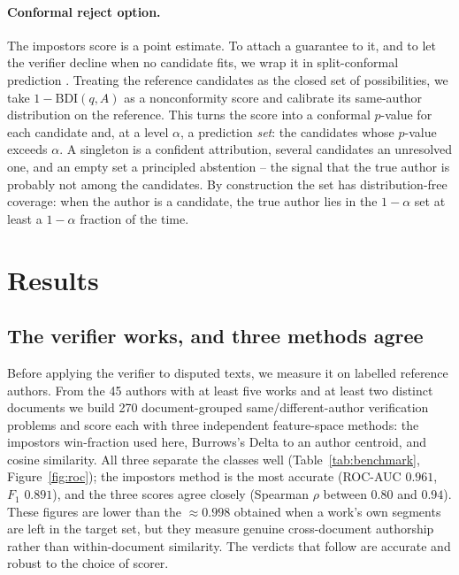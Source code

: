 \documentclass{anthology-ch}
\begin{document}
\paragraph{Conformal reject option.} The impostors score is a point estimate. To attach a guarantee to it, and to let the verifier decline when no candidate fits, we wrap it in split-conformal prediction \cite{vovk2005,angelopoulos2023}. Treating the reference candidates as the closed set of possibilities, we take $1-\mathrm{BDI}(q,A)$ as a nonconformity score and calibrate its same-author distribution on the reference. This turns the score into a conformal $p$-value for each candidate and, at a level $\alpha$, a prediction \emph{set}: the candidates whose $p$-value exceeds $\alpha$. A singleton is a confident attribution, several candidates an unresolved one, and an empty set a principled abstention -- the signal that the true author is probably not among the candidates. By construction the set has distribution-free coverage: when the author is a candidate, the true author lies in the $1-\alpha$ set at least a $1-\alpha$ fraction of the time.

\section{Results}

\subsection{The verifier works, and three methods agree}

Before applying the verifier to disputed texts, we measure it on labelled reference authors. From the 45 authors with at least five works and at least two distinct documents we build 270 document-grouped same/different-author verification problems and score each with three independent feature-space methods: the impostors win-fraction used here, Burrows's Delta to an author centroid, and cosine similarity. All three separate the classes well (Table~\ref{tab:benchmark}, Figure~\ref{fig:roc}); the impostors method is the most accurate (ROC-AUC $0.961$, $F_1$ $0.891$), and the three scores agree closely (Spearman $\rho$ between $0.80$ and $0.94$). These figures are lower than the $\approx\!0.998$ obtained when a work's own segments are left in the target set, but they measure genuine cross-document authorship rather than within-document similarity. The verdicts that follow are accurate and robust to the choice of scorer.
\end{document}
